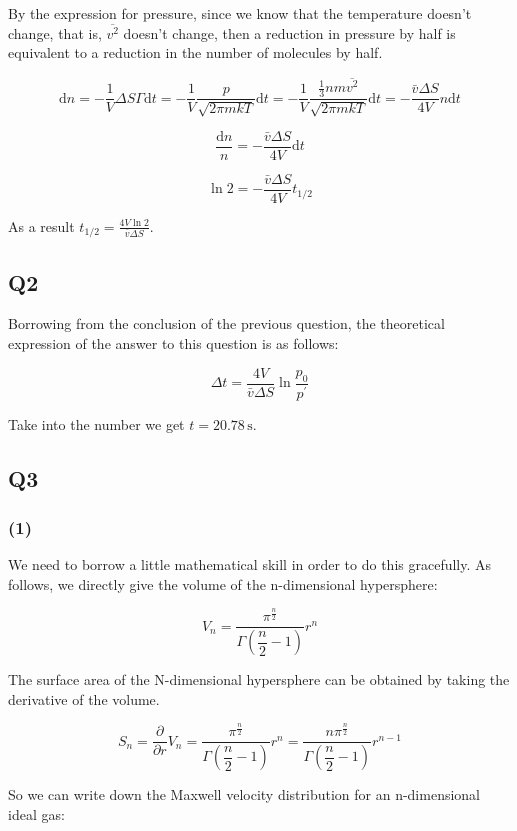 \documentclass[a4paper,11pt]{amsart}
\theoremstyle{definition}
\begin{document}
	By the expression for pressure, since we know that the temperature doesn't change, that is, $\overline{v^2}$ doesn't change, then a reduction in pressure by half is equivalent to a reduction in the number of molecules by half.

	$$
	\mathrm{d}n=-\frac{1}{V}\Delta S\varGamma \mathrm{d}t=-\frac{1}{V}\frac{p}{\sqrt{2\pi mkT}}\mathrm{d}t=-\frac{1}{V}\frac{\frac{1}{3}nm\overline{v^2}}{\sqrt{2\pi mkT}}\mathrm{d}t=-\frac{\bar{v}\Delta S}{4V}n\mathrm{d}t
	$$

	$$
	\frac{\mathrm{d}n}{n}=-\frac{\bar{v}\Delta S}{4V}\mathrm{d}t
	$$

	$$
	\ln 2=-\frac{\bar{v}\Delta S}{4V}t_{1/2}
	$$

	As a result $\displaystyle t_{1/2}=\frac{4V\ln 2}{\bar{v}\Delta S}$.

	\subsection*{Q2}

	Borrowing from the conclusion of the previous question, the theoretical expression of the answer to this question is as follows:

	$$
	\Delta t=\frac{4V}{\bar{v}\Delta S}\ln \frac{p_0}{p^{\prime}}
	$$

	Take into the number we get $t=20.78\,\mathrm{s}$.

	\subsection*{Q3}

	\subsubsection*{(1)}
	
	We need to borrow a little mathematical skill in order to do this gracefully. As follows, we directly give the volume of the n-dimensional hypersphere:

	$$
	V_n=\frac{\pi ^{\tfrac{n}{2}}}{\Gamma \left( \dfrac{n}{2}-1 \right)}r^n
	$$

	The surface area of the N-dimensional hypersphere can be obtained by taking the derivative of the volume.

	$$
	S_n=\frac{\partial}{\partial r}V_n=\frac{\pi ^{\tfrac{n}{2}}}{\Gamma \left( \dfrac{n}{2}-1 \right)}r^n=\frac{n\pi ^{\tfrac{n}{2}}}{\Gamma \left( \dfrac{n}{2}-1 \right)}r^{n-1}
	$$

	So we can write down the Maxwell velocity distribution for an n-dimensional ideal gas:
\end{document}
